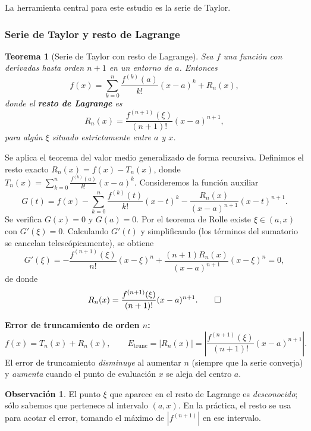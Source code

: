 \documentclass[a4paper,12pt]{article}
\theoremstyle{definition}
\newtheorem{observacion}{Observación}[section]
\theoremstyle{plain}
\newtheorem{teorema}{Teorema}[section]
\begin{document}
La herramienta central para este estudio es la serie de Taylor.

\subsubsection{Serie de Taylor y resto de Lagrange}

\begin{teorema}[Serie de Taylor con resto de Lagrange]
Sea $f$ una función con derivadas hasta orden $n+1$ en un entorno de $a$.
Entonces
\[
    f(x) = \sum_{k=0}^{n} \frac{f^{(k)}(a)}{k!}(x-a)^k + R_n(x),
\]
donde el \textbf{resto de Lagrange} es
\[
    R_n(x) = \frac{f^{(n+1)}(\xi)}{(n+1)!}(x-a)^{n+1},
\]
para algún $\xi$ situado estrictamente entre $a$ y $x$.
\end{teorema}

\begin{demostracion}
Se aplica el teorema del valor medio generalizado de forma recursiva.
Definimos el resto exacto $R_n(x) = f(x) - T_n(x)$, donde
$T_n(x) = \sum_{k=0}^{n} \frac{f^{(k)}(a)}{k!}(x-a)^k$.
Consideremos la función auxiliar
\[
    G(t) = f(x) - \sum_{k=0}^{n}\frac{f^{(k)}(t)}{k!}(x-t)^k
           - \frac{R_n(x)}{(x-a)^{n+1}}(x-t)^{n+1}.
\]
Se verifica $G(x) = 0$ y $G(a) = 0$. Por el teorema de Rolle existe
$\xi \in (a,x)$ con $G'(\xi) = 0$. Calculando $G'(t)$ y simplificando
(los términos del sumatorio se cancelan telescópicamente), se obtiene
\[
    G'(\xi) = -\frac{f^{(n+1)}(\xi)}{n!}(x-\xi)^n
              + \frac{(n+1)R_n(x)}{(x-a)^{n+1}}(x-\xi)^n = 0,
\]
de donde
\[
    R_n(x) = \frac{f^{(n+1)}(\xi)}{(n+1)!}(x-a)^{n+1}. \qedhere
\]
\end{demostracion}

\begin{cajaresultado}
\textbf{Error de truncamiento de orden $n$:}
\[
    f(x) = T_n(x) + R_n(x),
    \qquad
    E_{\mathrm{trunc}} = |R_n(x)| = \left|\frac{f^{(n+1)}(\xi)}{(n+1)!}
    (x-a)^{n+1}\right|.
\]
El error de truncamiento \emph{disminuye} al aumentar $n$ (siempre que la serie
converja) y \emph{aumenta} cuando el punto de evaluación $x$ se aleja del centro
$a$.
\end{cajaresultado}

\begin{observacion}
El punto $\xi$ que aparece en el resto de Lagrange es \emph{desconocido}; sólo
sabemos que pertenece al intervalo $(a,x)$. En la práctica, el resto se usa para
acotar el error, tomando el máximo de $|f^{(n+1)}|$ en ese intervalo.
\end{observacion}
\end{document}
